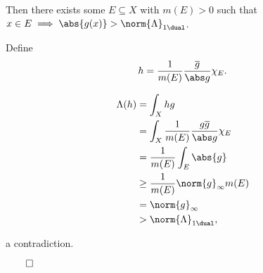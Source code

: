 Then there exists some \(E\subseteq X\) with \(m(E) > 0\) such that
\(x\in E \implies \abs{g(x)} > \norm{\Lambda}_{1\dual}\).

Define \begin{align*}
h = \frac{1}{m(E)} \frac{\overline{g}}{\abs g} \chi_E
.\end{align*}

\begin{align*}
\Lambda(h) &= \int_X hg \\
&= \int_X \frac{1}{m(E)} \frac{g \overline g}{\abs g} \chi_E \\
&= \frac{1}{m(E)} \int_E \abs{g} \\
&\geq \frac{1}{m(E)} \norm{g}_\infty m(E) \\
&= \norm{g}_\infty \\
&> \norm{\Lambda}_{1\dual}
,\end{align*}

a contradiction.

\(\qed\)





